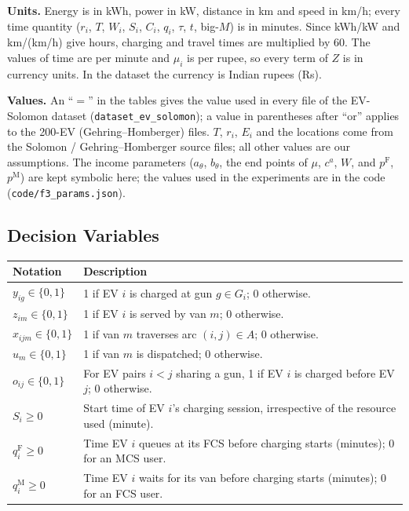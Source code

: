 \documentclass[12pt,a4paper]{article}
\begin{document}
\textbf{Units.} Energy is in kWh, power in kW, distance in km and speed in km/h; every time quantity ($r_i$, $T$, $W_i$, $S_i$, $C_i$, $q_i$, $\tau$, $t$, big-$M$) is in minutes. Since kWh/kW and km/(km/h) give hours, charging and travel times are multiplied by 60. The values of time are per minute and $\mu_i$ is per rupee, so every term of $Z$ is in currency units. In the dataset the currency is Indian rupees (Rs).

\textbf{Values.} An ``$=$'' in the tables gives the value used in every file of the EV-Solomon dataset (\texttt{dataset\_ev\_solomon}); a value in parentheses after ``or'' applies to the 200-EV (Gehring--Homberger) files. $T$, $r_i$, $E_i$ and the locations come from the Solomon / Gehring--Homberger source files; all other values are our assumptions. The income parameters ($a_\theta$, $b_\theta$, the end points of $\mu$, $c^{a}$, $W$, and $p^{\mathrm F}$, $p^{\mathrm M}$) are kept symbolic here; the values used in the experiments are in the code (\texttt{code/f3\_params.json}).

\newpage
\subsection*{Decision Variables}
\begin{tabularx}{\textwidth}{@{}>{\raggedright\arraybackslash}p{4.6cm}X@{}}
\toprule
\textbf{Notation} & \textbf{Description} \\
\midrule
$y_{ig}\in\{0,1\}$ & 1 if EV $i$ is charged at gun $g\in G_i$; 0 otherwise. \\[2pt]
$z_{im}\in\{0,1\}$ & 1 if EV $i$ is served by van $m$; 0 otherwise. \\[2pt]
$x_{ijm}\in\{0,1\}$ & 1 if van $m$ traverses arc $(i,j)\in A$; 0 otherwise. \\[2pt]
$u_m\in\{0,1\}$ & 1 if van $m$ is dispatched; 0 otherwise. \\[2pt]
$o_{ij}\in\{0,1\}$ & For EV pairs $i<j$ sharing a gun, 1 if EV $i$ is charged before EV $j$; 0 otherwise. \\[2pt]
$S_i\ge0$ & Start time of EV $i$'s charging session, irrespective of the resource used (minute). \\[2pt]
$q^{\mathrm F}_i\ge0$ & Time EV $i$ queues at its FCS before charging starts (minutes); 0 for an MCS user. \\[2pt]
$q^{\mathrm M}_i\ge0$ & Time EV $i$ waits for its van before charging starts (minutes); 0 for an FCS user. \\
\bottomrule
\end{tabularx}
\end{document}

